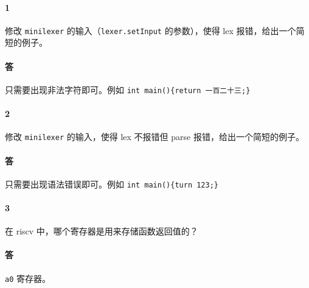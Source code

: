 \documentclass[UTF8]{ctexart}
\newcommand{\T}[1]{\texttt{{#1}}}
\begin{document}
        \paragraph{1} 修改 \T{minilexer} 的输入（\T{lexer.setInput} 的参数），使得 lex 报错，给出一个简短的例子。
        \paragraph{答} 只需要出现非法字符即可。例如 \T{int main()\{return 一百二十三;\}}
        
        \paragraph{2} 修改 \T{minilexer} 的输入，使得 lex 不报错但 parse 报错，给出一个简短的例子。
        \paragraph{答} 只需要出现语法错误即可。例如 \T{int main()\{turn 123;\}}

        \paragraph{3} 在 riscv 中，哪个寄存器是用来存储函数返回值的？
        \paragraph{答} \T{a0} 寄存器。
\end{document}
